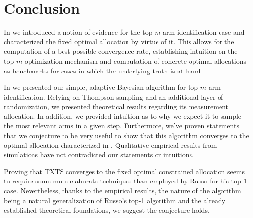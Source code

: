 \chapter{Conclusion}\label{chapter:conclusion}

In  we introduced a notion of evidence for the top-$m$ arm
identification case and characterized the fixed optimal allocation by virtue of
it. This allows for the computation of a best-possible convergence rate,
establishing intuition on the top-$m$ optimization mechanism and computation of
concrete optimal allocations as benchmarks for cases in which the underlying
truth is at hand.

In  we presented our simple, adaptive Bayesian algorithm
for top-$m$ arm identification. Relying on Thompson sampling and an additional
layer of randomization, we presented theoretical results regarding its
measurement allocation. In addition, we provided intuition as to why we expect
it to sample the most relevant arms in a given step. Furthermore, we've proven
statements that we conjecture to be very useful to show that this algorithm
converges to the optimal allocation characterized in .
Qualitative empirical results from simulations have not contradicted our
statements or intuitions.

Proving that TXTS converges to the fixed optimal constrained allocation seems to
require some more elaborate techniques than employed by Russo for his top-1
case. Nevertheless, thanks to the empirical results, the nature of the algorithm
being a natural generalization of Russo's top-1 algorithm and the already
established theoretical foundations, we suggest the conjecture holds.
